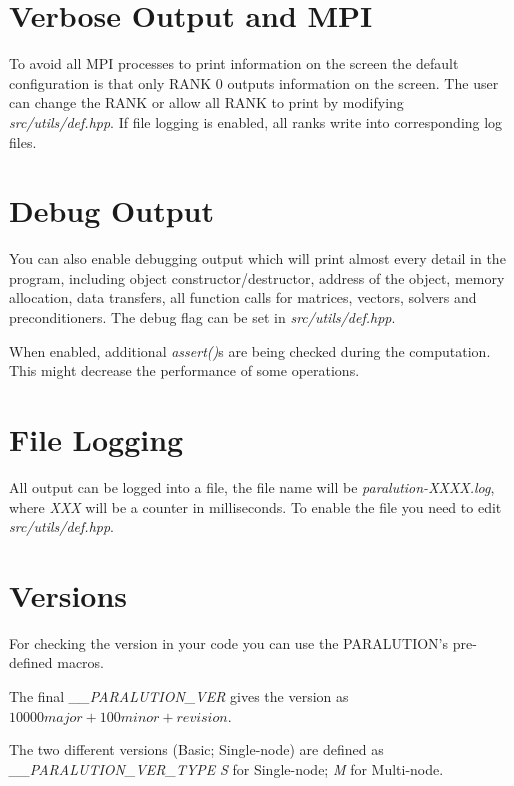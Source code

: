 \section{Verbose Output and MPI}

To avoid all MPI processes to print information on the screen the default configuration is that only RANK 0 outputs information on the screen. The user can change the RANK or allow all RANK to print by modifying \emph{src/utils/def.hpp}. If file logging is enabled, all ranks write into corresponding log files.

\section{Debug Output}

You can also enable debugging output which will print almost every detail in the program, including object constructor/destructor, address of the object, memory allocation, data transfers, all function calls for matrices, vectors, solvers and preconditioners. The debug flag can be set in \emph{src/utils/def.hpp}.

When enabled, additional \emph{assert()}s are being checked during the computation. This might decrease the performance of some operations.

\section{File Logging}

All output can be logged into a file, the file name will be \emph{paralution-XXXX.log}, where \emph{XXX} will be a counter in milliseconds. To enable the file you need to edit \emph{src/utils/def.hpp}.

\section{Versions}

For checking the version in your code you can use the PARALUTION's pre-defined macros. 


The final \emph{\_\_PARALUTION\_VER} gives the version as $10000 major + 100 minor + revision$.

The two different versions (Basic; Single-node) are defined as \emph{\_\_PARALUTION\_VER\_TYPE} \emph{S} for Single-node; \emph{M} for Multi-node.
